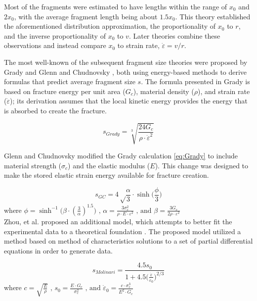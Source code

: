 \documentclass[12pt,a4paper]{article}
\begin{document}
Most of the fragments were estimated to have lengths within the range of $x_{0}$ and $2x_{0}$, with the average fragment length being about $1.5x_{0}$. This theory established the aforementioned distribution approximation, the proportionality of $x_{0}$ to $r$, and the inverse proportionality of $x_{0}$ to $v$. Later theories combine these observations and instead compare $x_{0}$ to strain rate, $\dot{\varepsilon} = v/r$.

The most well-known of the subsequent fragment size theories were proposed by Grady \cite{Grady1982} and Glenn and Chudnovsky \cite{GlennChudnovsky1986}, both using energy-based methods to derive formulas that predict average fragment size $s$. The formula presented in Grady is based on fracture energy per unit area ($G_{c}$), material density ($\rho$), and strain rate ($\dot{\varepsilon}$); its derivation assumes that the local kinetic energy provides the energy that is absorbed to create the fracture.

\begin{equation}
s_{Grady} = \sqrt[3]{\frac{24G_{c}}{\rho \cdot \dot{\varepsilon}^2}}
\label{eq:Grady}
\end{equation}

Glenn and Chudnovsky modified the Grady calculation \eqref{eq:Grady} to include material strength ($\sigma_{c}$) and the elastic modulus ($E$). This change was designed to make the stored elastic strain energy available for fracture creation.

\begin{equation}
s_{GC} = 4 \sqrt\frac{\alpha}{3} \cdot \sinh\Big(\frac{\phi}{3}\Big)
\label{eq:GlennChudnovsky}
\end{equation}
where $\phi = \sinh^{-1}\Big(\beta \cdot (\frac{3}{\alpha})^{1.5}\Big) \mbox{ ,  } \alpha = \frac{3\sigma_{c}^2}{\rho \cdot E \cdot \varepsilon^2} \mbox{ , and  } \beta = \frac{3G_{c}}{2\rho \cdot \varepsilon^2}$\\

Zhou, et al. proposed an additional model, which attempts to better fit the experimental data to a theoretical foundation \cite{ZhouAPL2006}. The proposed model utilized a method based on method of characteristics solutions to a set of partial differential equations in order to generate data.

\begin{equation}
s_{Molinari} = \frac{4.5 s_{0}}{ 1 + 4.5 \Big( \frac{\dot{\varepsilon}}{\dot{\varepsilon}_{0}}\Big)^{2/3}}
\label{eq:Molinari}
\end{equation}
where $c = \sqrt{\frac{E}{\rho}} \mbox{ ,  } s_{0} = \frac{E \cdot G_{c}}{\sigma_{c}^{2}} \mbox{ , and  } \dot{\varepsilon}_{0} = \frac{c \cdot \sigma_{c}^{3}}{E^{2} \cdot G_{c}}$\\
\end{document}
